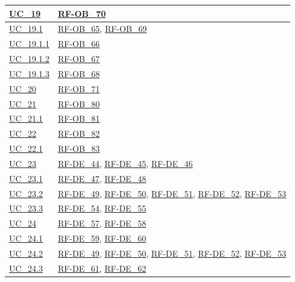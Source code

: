 \begin{longtable}{|
        >{\raggedright\arraybackslash}p{} |
        >{\raggedright\arraybackslash}p{} |
    }
    \hyperref[uc_19]{UC\_19} & \hyperlink{rf-ob_70}{RF-OB\_70} \\
    \hline
    \hyperref[uc_19.1]{UC\_19.1} & \hyperlink{rf-ob_65}{RF-OB\_65}, \hyperlink{rf-ob_69}{RF-OB\_69} \\
    \hline
    \hyperref[uc_19.1.1]{UC\_19.1.1} & \hyperlink{rf-ob_66}{RF-OB\_66} \\
    \hline
    \hyperref[uc_19.1.2]{UC\_19.1.2} & \hyperlink{rf-ob_67}{RF-OB\_67} \\
    \hline
    \hyperref[uc_19.1.3]{UC\_19.1.3} & \hyperlink{rf-ob_68}{RF-OB\_68} \\
    \hline

    \hyperref[uc_20]{UC\_20} & \hyperlink{rf-ob_71}{RF-OB\_71} \\
    \hline

    \hyperref[uc_21]{UC\_21} & \hyperlink{rf-ob_80}{RF-OB\_80} \\
    \hline
    \hyperref[uc_21.1]{UC\_21.1} & \hyperlink{rf-ob_81}{RF-OB\_81} \\
    \hline

    \hyperref[uc_22]{UC\_22} & \hyperlink{rf-ob_82}{RF-OB\_82} \\
    \hline
    \hyperref[uc_22.1]{UC\_22.1} & \hyperlink{rf-ob_83}{RF-OB\_83} \\
    \hline

    \hyperref[uc_23]{UC\_23} & \hyperlink{rf-de_44}{RF-DE\_44}, \hyperlink{rf-de_45}{RF-DE\_45}, \hyperlink{rf-de_46}{RF-DE\_46} \\
    \hline
    \hyperref[uc_23.1]{UC\_23.1} & \hyperlink{rf-de_47}{RF-DE\_47}, \hyperlink{rf-de_48}{RF-DE\_48} \\
    \hline
    \hyperref[uc_23.2]{UC\_23.2} & \hyperlink{rf-de_49}{RF-DE\_49}, \hyperlink{rf-de_50}{RF-DE\_50}, \hyperlink{rf-de_51}{RF-DE\_51}, \hyperlink{rf-de_52}{RF-DE\_52}, \hyperlink{rf-de_53}{RF-DE\_53} \\
    \hline
    \hyperref[uc_23.3]{UC\_23.3} & \hyperlink{rf-de_54}{RF-DE\_54}, \hyperlink{rf-de_55}{RF-DE\_55} \\
    \hline

    \hyperref[uc_24]{UC\_24} & \hyperlink{rf-de_57}{RF-DE\_57}, \hyperlink{rf-de_58}{RF-DE\_58} \\
    \hline
    \hyperref[uc_24.1]{UC\_24.1} & \hyperlink{rf-de_59}{RF-DE\_59}, \hyperlink{rf-de_60}{RF-DE\_60} \\
    \hline
    \hyperref[uc_24.2]{UC\_24.2} & \hyperlink{rf-de_49}{RF-DE\_49}, \hyperlink{rf-de_50}{RF-DE\_50}, \hyperlink{rf-de_51}{RF-DE\_51}, \hyperlink{rf-de_52}{RF-DE\_52}, \hyperlink{rf-de_53}{RF-DE\_53} \\
    \hline
    \hyperref[uc_24.3]{UC\_24.3} & \hyperlink{rf-de_61}{RF-DE\_61}, \hyperlink{rf-de_62}{RF-DE\_62} \\
    \hline


\end{longtable}
